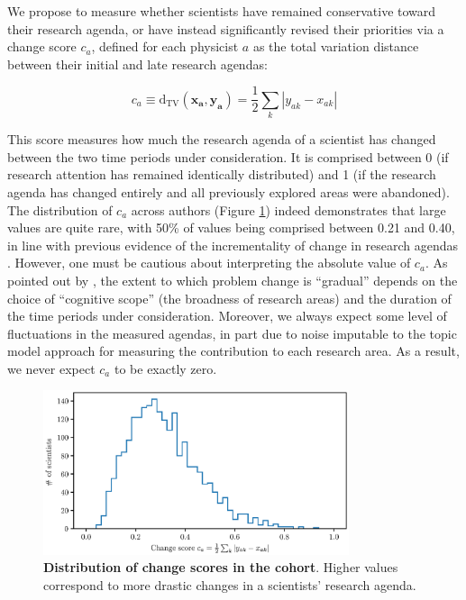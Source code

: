 \documentclass{article}
\begin{document}
We propose to measure whether scientists have remained conservative toward their research agenda, or have instead significantly revised their priorities via a change score $c_a$, defined for each physicist $a$ as the total variation distance between their initial and late research agendas:

\begin{equation}
    c_a \equiv \mathrm{d}_{\text{TV}}(\bm{x_a},\bm{y_a}) = \frac{1}{2} \sum_k |y_{ak}-x_{ak}|
\end{equation}

This score measures how much the research agenda of a scientist has changed between the two time periods under consideration. It is comprised between 0 (if research attention has remained identically distributed) and 1 (if the research agenda has changed entirely and all previously explored areas were abandoned). The distribution of $c_a$ across authors (Figure \ref{fig:change_scores}) indeed demonstrates that large values are quite rare, with 50\% of values being comprised between 0.21 and 0.40, in line with previous evidence of the incrementality of change in research agendas \citep{Gieryn1978,Jia2017,Aleta2019}. However, one must be cautious about interpreting the absolute value of $c_a$. As pointed out by \citet{Gieryn1978}, the extent to which problem change is ``gradual'' depends on the choice of ``cognitive scope'' (the broadness of research areas) and the duration of the time periods under consideration.  Moreover, we always expect some level of fluctuations in the measured agendas, in part due to noise imputable to the topic model approach for measuring the contribution to each research area. As a result, we never expect $c_a$ to be exactly zero.

\begin{figure}[h]
    \centering
        \includegraphics[width=0.8\textwidth]{plots/change_score.eps}
    \caption{\textbf{Distribution of change scores in the cohort}. Higher values correspond to more drastic changes in a scientists' research agenda.}    
    \label{fig:change_scores}
\end{figure}
\end{document}
